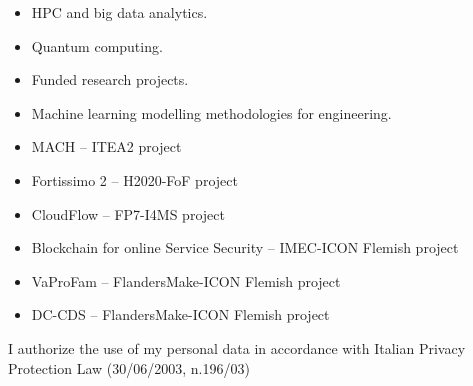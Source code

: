 \documentclass[10pt,a4paper]{altacv}
\begin{document}

\begin{itemize}
\item HPC and big data analytics.
\item Quantum computing.
\item Funded research projects.
\end{itemize}

\divider

\begin{itemize}
\item Machine learning modelling methodologies for engineering.
\end{itemize}


\smallskip
\begin{itemize}
\item MACH -- ITEA2 project
\item Fortissimo 2 -- H2020-FoF project
\item CloudFlow -- FP7-I4MS project
\item Blockchain for online Service Security -- IMEC-ICON Flemish project
\item VaProFam -- FlandersMake-ICON Flemish project
\item DC-CDS -- FlandersMake-ICON Flemish project
\end{itemize}

\divider 

{\color{gray} \small I authorize the use of my personal data in accordance with Italian Privacy Protection Law (30/06/2003, n.196/03)}
\end{document}
